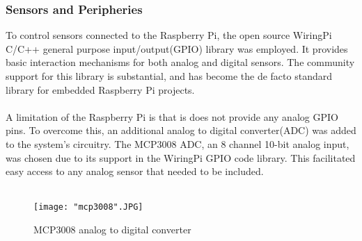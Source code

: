\documentclass{article}
\begin{document}
\subsubsection{Sensors and Peripheries}
To control sensors connected to the Raspberry Pi, the open source WiringPi C/C++ general purpose input/output(GPIO) library was employed. It provides basic interaction mechanisms for both analog and digital sensors. The community support for this library is substantial, and has become the de facto standard library for embedded Raspberry Pi projects. \\\\
A limitation of the Raspberry Pi is that is does not provide any analog GPIO pins. To overcome this, an additional analog to digital converter(ADC) was added to the system’s circuitry. The MCP3008 ADC, an 8 channel 10-bit analog input,  was chosen due to its support in the WiringPi GPIO code library. This facilitated easy access to any analog sensor that needed to be included. \\\\

\begin{figure}[H]
\centering
\texttt{[image: "mcp3008".JPG]}
\caption{MCP3008 analog to digital converter}
\label{fig:hard_adc}
\end{figure}
\end{document}
